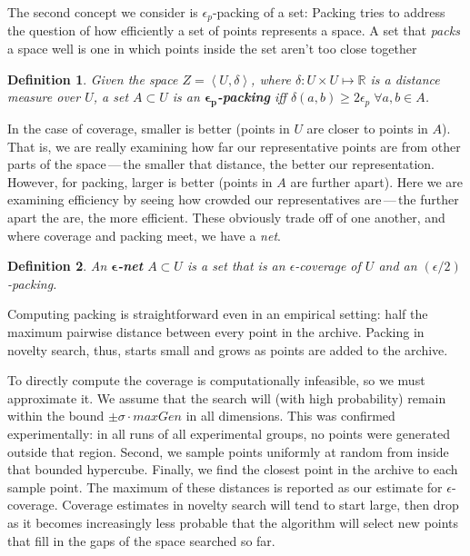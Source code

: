 \documentclass[twoside]{article}
\newtheorem{definition}{Definition}
\newcommand{\IR}{\mathbb{R}}
\begin{document}
The second concept we consider is $\epsilon_p$-packing of a set:  Packing tries to address the question of how efficiently a set of points represents a space.  A set that \emph{packs} a space well is one in which points inside the set aren't too close together

\begin{definition}
Given the space $Z=\left\langle U, \delta\right\rangle$, where $\delta: U\times U \mapsto \IR$ is a distance measure over $U$, a set $A\subset U$ is an $\boldsymbol{\epsilon_p}$\textbf{-packing} iff $\delta(a,b) \geq 2\epsilon_p \; \forall a,b \in A$. 
\end{definition}

In the case of coverage, smaller is better (points in $U$ are closer to points in $A$).  That is, we are really examining how far our representative points are from other parts of the space\,---\,the smaller that distance, the better our representation.  However, for packing, larger is better (points in $A$ are further apart).  Here we are examining efficiency by seeing how crowded our representatives are\,---\,the further apart the are, the more efficient.  These obviously trade off of one another, and where coverage and packing meet, we have a \emph{net}.  

\begin{definition}
An $\boldsymbol{\epsilon}$\textbf{-net} $A \subset U$ is a set that is an $\epsilon$-coverage of $U$ and an $(\epsilon/2)$-packing.
\end{definition}

Computing packing is straightforward even in an empirical setting:  half the maximum pairwise distance between every point in the archive.  Packing in novelty search, thus, starts small and grows as points are added to the archive. 

To directly compute the coverage is computationally infeasible, so we must approximate it.  We assume that the search will (with high probability) remain within the bound $\pm\sigma\cdot maxGen$ in all dimensions.  This was confirmed experimentally:  in all runs of all experimental groups, no points were generated outside that region.  Second, we sample points uniformly at random from inside that bounded hypercube.  Finally, we find the closest point in the archive to each sample point. The maximum of these distances is reported as our estimate for $\epsilon$-coverage.  Coverage estimates in novelty search will tend to start large, then drop as it becomes increasingly less probable that the algorithm will select new points that fill in the gaps of the space searched so far.
\end{document}
